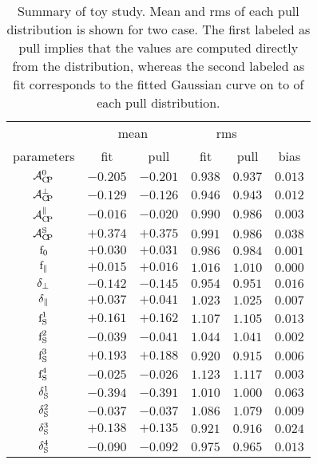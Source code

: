 \begin{table}[!h]
  \centering
  \footnotesize
  \begin{tabular}{c c c c c | c}
    \cline{2-5}
               & \multicolumn{2}{c}{mean} & \multicolumn{2}{c}{rms} &  \\
    \cline{2-6}
    parameters & fit & pull & fit & pull & bias \\
    \cline{1-6}
    $                  \mathcal{A}_{\rm C\!P}^{0}$ & $-0.205$ & $-0.201$ & $0.938$ & $0.937$  & $0.013$ \\
    $              \mathcal{A}_{\rm C\!P}^{\perp}$ & $-0.129$ & $-0.126$ & $0.946$ & $0.943$  & $0.012$ \\
    $          \mathcal{A}_{\rm C\!P}^{\parallel}$ & $-0.016$ & $-0.020$ & $0.990$ & $0.986$  & $0.003$ \\
    $                  \mathcal{A}_{\rm C\!P}^{\rm S}$ & $+0.374$ & $+0.375$ & $0.991$ & $0.986$  & $0.038$ \\
    \hline
    $                   \text{f}_{0}$ & $+0.030$ & $+0.031$ & $0.986$ & $0.984$  & $0.001$ \\
    $           \text{f}_{\parallel}$ & $+0.015$ & $+0.016$ & $1.016$ & $1.010$  & $0.000$ \\
    $         \delta_{\perp}$ & $-0.142$ & $-0.145$ & $0.954$ & $0.951$  & $0.016$ \\
    $     \delta_{\parallel}$ & $+0.037$ & $+0.041$ & $1.023$ & $1.025$  & $0.007$ \\
    \hline
    $                   \text{f}_{\text{S}}^{1}$ & $+0.161$ & $+0.162$ & $1.107$ & $1.105$  & $0.013$ \\
    $                   \text{f}_{\text{S}}^{2}$ & $-0.039$ & $-0.041$ & $1.044$ & $1.041$  & $0.002$ \\
    $                   \text{f}_{\text{S}}^{3}$ & $+0.193$ & $+0.188$ & $0.920$ & $0.915$  & $0.006$ \\
    $                   \text{f}_{\text{S}}^{4}$ & $-0.025$ & $-0.026$ & $1.123$ & $1.117$  & $0.003$ \\
    $               \delta_{\text{S}}^{1}$ & $-0.394$ & $-0.391$ & $1.010$ & $1.000$  & $0.063$ \\
    $               \delta_{\text{S}}^{2}$ & $-0.037$ & $-0.037$ & $1.086$ & $1.079$  & $0.009$ \\
    $               \delta_{\text{S}}^{3}$ & $+0.138$ & $+0.135$ & $0.921$ & $0.916$  & $0.024$ \\
    $               \delta_{\text{S}}^{4}$ & $-0.090$ & $-0.092$ & $0.975$ & $0.965$  & $0.013$ \\
  \end{tabular}
  \caption{Summary of toy study. Mean and rms of each pull distribution is shown for two case.
           The first labeled as pull implies that the values are computed directly from the distribution,
           whereas the second labeled as fit corresponds to the fitted Gaussian curve on to of each pull distribution.}
  \label{pull_table}
\end{table}

